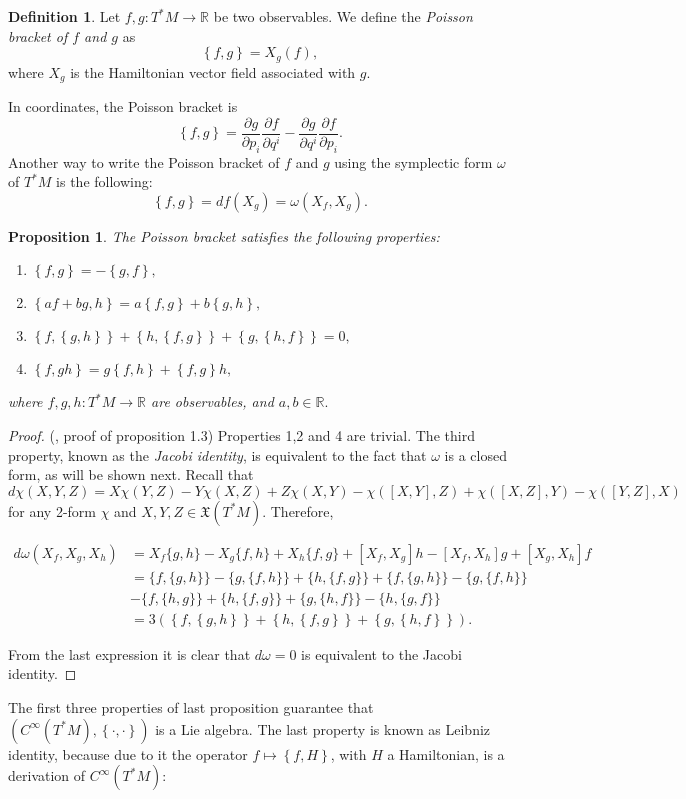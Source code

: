 \documentclass[12pt, letterpaper, reqno]{amsart}
\theoremstyle{definition}
\newtheorem{df}{Definition}
\theoremstyle{plain}
\newtheorem{prop}{Proposition}
\theoremstyle{remark}
\begin{document}
\begin{df}
	Let $ f,g: T^*M \rightarrow \mathbb{R} $ be two observables. We define the \textit{Poisson bracket of $ f $ and $ g $ } as 
	$$ \left\{ f,g \right\}= X_g(f),$$ 
	where $ X_g  $ is the Hamiltonian vector field associated with $ g. $ 
\end{df}
In coordinates, the Poisson bracket is 
$$ \left\{ f,g \right\} = \frac{\partial g}{\partial p_i}\frac{\partial f}{\partial q^i} - \frac{\partial g}{\partial q^i} \frac{\partial f}{\partial p_i}.   $$ 
Another way to write the Poisson bracket of $ f $ and $ g $ using the symplectic form $ \omega $ of $ T^*M $ is the following:
$$ \left\{ f,g \right\} = df(X_g)=\omega (X_f,X_g). $$ 
\begin{prop}
	The Poisson bracket satisfies the following properties:
	\begin{enumerate}
		\item $ \left\{ f,g \right\} = -\left\{ g,f \right\},$ 
		\item $ \left\{ af+bg,h \right\} = a\left\{ f,g \right\}+ b \left\{ g,h \right\} ,   $ 
		\item $ \left\{ f, \left\{ g,h \right\}  \right\} +\left\{ h, \left\{ f,g \right\}  \right\} + \left\{ g, \left\{ h,f \right\}  \right\} =0, $  
		\item $ \left\{ f,gh \right\} =g \left\{ f,h \right\} + \left\{ f,g \right\} h,$ 
	\end{enumerate}
	where $ f,g,h: T^*M \rightarrow \mathbb{R} $ are observables, and $ a,b\in \mathbb{R}. $ 
\end{prop}
\begin{proof}
	(\cite{poisson}, proof of proposition 1.3) Properties 1,2 and 4 are trivial. The third property, known as the \textit{Jacobi identity},  is equivalent to the fact that $ \omega $ is a closed form, as will be shown next. Recall that $$ d\chi(X,Y,Z)=X\chi(Y,Z)-Y\chi(X,Z)+Z\chi(X,Y)-\chi([X,Y],Z)+\chi([X,Z],Y)-\chi([Y,Z],X) $$ 
	for any 2-form $ \chi $ and $ X,Y,Z\in \mathfrak{X}(T^*M). $ Therefore, 
	

$\begin{aligned}
	d \omega\left(X_{f}, X_{g}, X_{h}\right) &=X_{f}\{g, h\}-X_{g}\{f, h\}+X_{h}\{f, g\}+\left[X_{f}, X_{g}\right] h-\left[X_{f}, X_{h}\right] g+\left[X_{g}, X_{h}\right] f \\
&=\{f,\{g, h\}\}-\{g,\{f, h\}\}+\{h,\{f, g\}\}+\{f,\{g, h\}\}-\{g,\{f, h\}\} \\
&-\{f,\{h, g\}\}+\{h,\{f, g\}\}+\{g,\{h, f\}\}-\{h,\{g, f\}\} \\
&=3 \left( \left\{ f, \left\{ g,h \right\}  \right\} +\left\{ h, \left\{ f,g \right\}  \right\} + \left\{ g, \left\{ h,f \right\}  \right\}\right).  
\end{aligned}$

From the last expression it is clear that $ d\omega=0 $ is equivalent to the Jacobi identity.
\end{proof}
The first three properties of last proposition guarantee that $ \left( C^\infty(T^*M), \left\{ \cdot,\cdot \right\}  \right) $ is a Lie algebra. The last property is known as Leibniz identity, because due to it the operator $ f\mapsto \left\{ f,H \right\}  $, with $ H $ a Hamiltonian, is a derivation of $ C^\infty(T^*M): $ 
\end{document}
